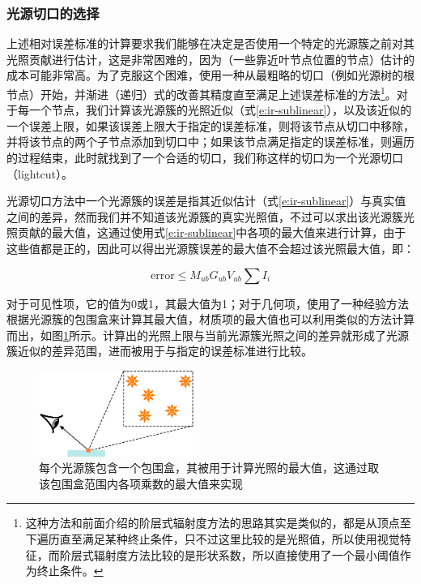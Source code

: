 \subsubsection{光源切口的选择}
上述相对误差标准的计算要求我们能够在决定是否使用一个特定的光源簇之前对其光照贡献进行估计，这是非常困难的，因为（一些靠近叶节点位置的节点）估计的成本可能非常高。为了克服这个困难，\cite{a:Lightcuts:AScalableApproachtoIllumination}使用一种从最粗略的切口（例如光源树的根节点）开始，并渐进（递归）式的改善其精度直至满足上述误差标准的方法\footnote{这种方法和前面介绍的阶层式辐射度方法的思路其实是类似的，都是从顶点至下遍历直至满足某种终止条件，只不过这里比较的是光照值，所以使用视觉特征，而阶层式辐射度方法比较的是形状系数，所以直接使用了一个最小阈值作为终止条件。}。对于每一个节点，我们计算该光源簇的光照近似（式\ref{e:ir-sublinear}），以及该近似的一个误差上限，如果该误差上限大于指定的误差标准，则将该节点从切口中移除，并将该节点的两个子节点添加到切口中；如果该节点满足指定的误差标准，则遍历的过程结束，此时就找到了一个合适的切口，我们称这样的切口为一个光源切口（lightcut）。

光源切口方法中一个光源簇的误差是指其近似估计（式\ref{e:ir-sublinear}）与真实值之间的差异，然而我们并不知道该光源簇的真实光照值，不过可以求出该光源簇光照贡献的最大值，这通过使用式\ref{e:ir-sublinear}中各项的最大值来进行计算，由于这些值都是正的，因此可以得出光源簇误差的最大值不会超过该光照最大值，即：

\begin{equation}
	\text{error}\leq M_{ub}G_{ub}V_{ub}\sum I_i
\end{equation}

对于可见性项，它的值为0或1，其最大值为1；对于几何项，\cite{a:Lightcuts:AScalableApproachtoIllumination}使用了一种经验方法根据光源簇的包围盒来计算其最大值，材质项的最大值也可以利用类似的方法计算而出，如图\ref{f:ir-light-cluster-error-bound}所示。计算出的光照上限与当前光源簇光照之间的差异就形成了光源簇近似的差异范围，进而被用于与指定的误差标准进行比较。

\begin{figure}
	\sidecaption
	\includegraphics[width=0.45\textwidth]{figures/ir/light-cluster-error-bound}
	\caption{每个光源簇包含一个包围盒，其被用于计算光照的最大值，这通过取该包围盒范围内各项乘数的最大值来实现}
	\label{f:ir-light-cluster-error-bound}
\end{figure}

